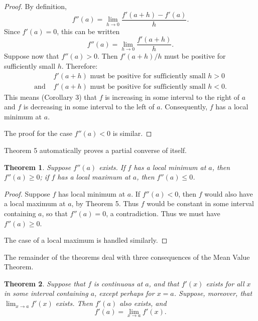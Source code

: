 \documentclass{article}
\newtheorem{theorem}{Theorem}
\begin{document}
\begin{proof}
  By definition, \begin{equation*}
    f''(a) = \lim_{h \rightarrow 0} \frac{f'(a + h) - f'(a)}{h}.
  \end{equation*} Since $f'(a) = 0$, this can be written \begin{equation*}
    f''(a) = \lim_{h \rightarrow 0} \frac{f'(a + h)}{h}.
  \end{equation*} Suppose now that $f''(a) > 0$. Then $f'(a + h) / h$ must be
  positive for sufficiently small $h$. Therefore: \begin{align*}
    &f'(a + h) \text{ must be positive for sufficiently small } h > 0 \\
    \text{and } &f'(a + h) \text{ must be positive for sufficiently small }h <
    0.
  \end{align*}
  This means (Corollary 3) that $f$ is increasing in some interval to the right
  of $a$ and $f$ is decreasing in some interval to the left of $a$.
  Consequently, $f$ has a local minimum at $a$.

  The proof for the case $f''(a) < 0$ is similar.
\end{proof}

Theorem 5 automatically proves a partial converse of itself.

\begin{theorem}
  Suppose $f''(a)$ exists. If $f$ has a local minimum at $a$, then $f''(a) \geq
  0$; if $f$ has a local maximum at $a$, then $f''(a) \leq 0$.
\end{theorem}

\begin{proof}
  Suppose $f$ has local minimum at $a$. If $f''(a) < 0$, then $f$ would also
  have a local maximum at $a$, by Theorem 5. Thus $f$ would be constant in some
  interval containing $a$, so that $f''(a) = 0$, a contradiction. Thus we must
  have $f''(a) \geq 0$.

  The case of a local maximum is handled similarly.
\end{proof}

The remainder of the theorems deal with three consequences of the Mean Value
Theorem.

\begin{theorem}
  Suppose that $f$ is continuous at $a$, and that $f'(x)$ exists for all $x$ in
  some interval containing $a$, except perhaps for $x = a$. Suppose, moreover,
  that $\lim_{x \rightarrow a} f'(x)$ exists. Then $f'(a)$ also exists, and
  \begin{equation*}
    f'(a) = \lim_{x \rightarrow a} f'(x).
  \end{equation*}
\end{theorem}
\end{document}

